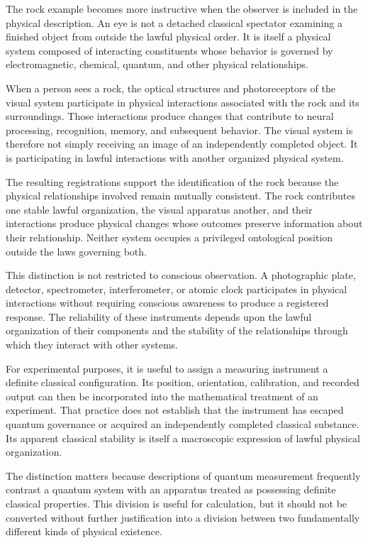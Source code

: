 \documentclass[12pt,onecolumn]{article}
\begin{document}
The rock example becomes more instructive when the observer is included in the physical description. An eye is not a detached classical spectator examining a finished object from outside the lawful physical order. It is itself a physical system composed of interacting constituents whose behavior is governed by electromagnetic, chemical, quantum, and other physical relationships.

When a person sees a rock, the optical structures and photoreceptors of the visual system participate in physical interactions associated with the rock and its surroundings. Those interactions produce changes that contribute to neural processing, recognition, memory, and subsequent behavior. The visual system is therefore not simply receiving an image of an independently completed object. It is participating in lawful interactions with another organized physical system.

The resulting registrations support the identification of the rock because the physical relationships involved remain mutually consistent. The rock contributes one stable lawful organization, the visual apparatus another, and their interactions produce physical changes whose outcomes preserve information about their relationship. Neither system occupies a privileged ontological position outside the laws governing both.

This distinction is not restricted to conscious observation. A photographic plate, detector, spectrometer, interferometer, or atomic clock participates in physical interactions without requiring conscious awareness to produce a registered response. The reliability of these instruments depends upon the lawful organization of their components and the stability of the relationships through which they interact with other systems.

For experimental purposes, it is useful to assign a measuring instrument a definite classical configuration. Its position, orientation, calibration, and recorded output can then be incorporated into the mathematical treatment of an experiment. That practice does not establish that the instrument has escaped quantum governance or acquired an independently completed classical substance. Its apparent classical stability is itself a macroscopic expression of lawful physical organization.

The distinction matters because descriptions of quantum measurement frequently contrast a quantum system with an apparatus treated as possessing definite classical properties. This division is useful for calculation, but it should not be converted without further justification into a division between two fundamentally different kinds of physical existence.
\end{document}
